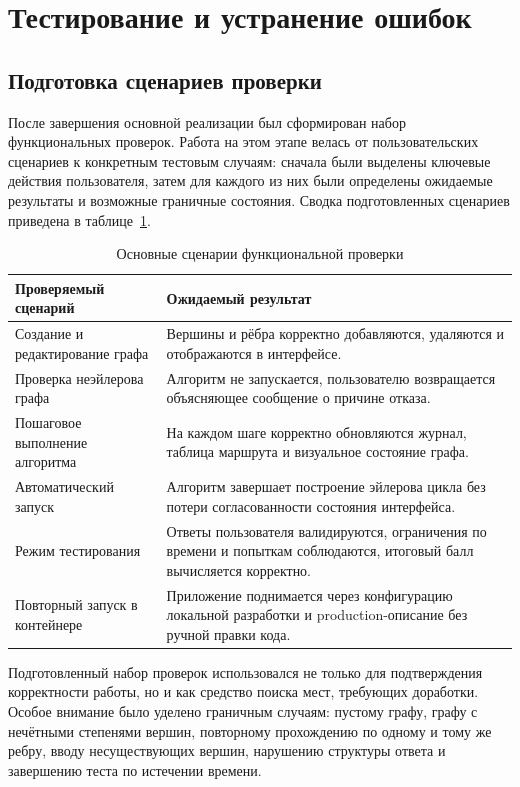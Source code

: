 \documentclass[a4paper,12pt]{extarticle}
\begin{document}
\section{Тестирование и устранение ошибок}

\subsection{Подготовка сценариев проверки}

После завершения основной реализации был сформирован набор функциональных проверок. Работа на этом этапе велась от пользовательских сценариев к конкретным тестовым случаям: сначала были выделены ключевые действия пользователя, затем для каждого из них были определены ожидаемые результаты и возможные граничные состояния. Сводка подготовленных сценариев приведена в таблице~\ref{tab:tests}.

\begin{table}[H]
\caption{Основные сценарии функциональной проверки}
\label{tab:tests}
\centering
\begin{tabular}{|p{4.5cm}|p{7.7cm}|}
\hline
\textbf{Проверяемый сценарий} & \textbf{Ожидаемый результат} \\ \hline
Создание и редактирование графа & Вершины и рёбра корректно добавляются, удаляются и отображаются в интерфейсе. \\ \hline
Проверка неэйлерова графа & Алгоритм не запускается, пользователю возвращается объясняющее сообщение о причине отказа. \\ \hline
Пошаговое выполнение алгоритма & На каждом шаге корректно обновляются журнал, таблица маршрута и визуальное состояние графа. \\ \hline
Автоматический запуск & Алгоритм завершает построение эйлерова цикла без потери согласованности состояния интерфейса. \\ \hline
Режим тестирования & Ответы пользователя валидируются, ограничения по времени и попыткам соблюдаются, итоговый балл вычисляется корректно. \\ \hline
Повторный запуск в контейнере & Приложение поднимается через конфигурацию локальной разработки и production-описание без ручной правки кода. \\ \hline
\end{tabular}
\end{table}

Подготовленный набор проверок использовался не только для подтверждения корректности работы, но и как средство поиска мест, требующих доработки. Особое внимание было уделено граничным случаям: пустому графу, графу с нечётными степенями вершин, повторному прохождению по одному и тому же ребру, вводу несуществующих вершин, нарушению структуры ответа и завершению теста по истечении времени.
\end{document}
